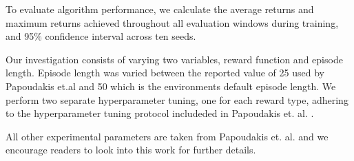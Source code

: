 \documentclass[systems,article,submit,pdftex,moreauthors]{Definitions/mdpi}
\begin{document}
To evaluate algorithm performance, we calculate the average returns and maximum returns achieved throughout all evaluation windows during training, and 95\% confidence interval across ten seeds.


Our investigation consists of varying two variables, reward function and episode length. Episode length was varied between the reported value of 25 used by Papoudakis et.al \cite{DBLP:Benchmarking} and 50 which is the environments default episode length. We perform two separate hyperparameter tuning, one for each reward type, adhering to the hyperparameter tuning protocol includeded in Papoudakis et. al. \cite{DBLP:Benchmarking}. 

All other experimental parameters are taken from Papoudakis et. al. \cite{DBLP:Benchmarking} and we encourage readers to look into this work for further details. 







\end{document}
